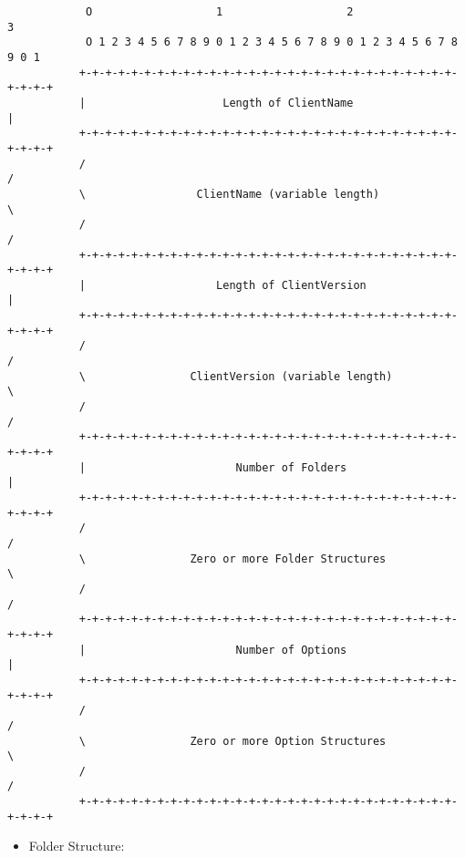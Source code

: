 \begin{verbatim}
            O                   1                   2                   3
            O 1 2 3 4 5 6 7 8 9 0 1 2 3 4 5 6 7 8 9 0 1 2 3 4 5 6 7 8 9 0 1
           +-+-+-+-+-+-+-+-+-+-+-+-+-+-+-+-+-+-+-+-+-+-+-+-+-+-+-+-+-+-+-+-+
           |                     Length of ClientName                      |
           +-+-+-+-+-+-+-+-+-+-+-+-+-+-+-+-+-+-+-+-+-+-+-+-+-+-+-+-+-+-+-+-+
           /                                                               /
           \                 ClientName (variable length)                  \
           /                                                               /
           +-+-+-+-+-+-+-+-+-+-+-+-+-+-+-+-+-+-+-+-+-+-+-+-+-+-+-+-+-+-+-+-+
           |                    Length of ClientVersion                    |
           +-+-+-+-+-+-+-+-+-+-+-+-+-+-+-+-+-+-+-+-+-+-+-+-+-+-+-+-+-+-+-+-+
           /                                                               /
           \                ClientVersion (variable length)                \
           /                                                               /
           +-+-+-+-+-+-+-+-+-+-+-+-+-+-+-+-+-+-+-+-+-+-+-+-+-+-+-+-+-+-+-+-+
           |                       Number of Folders                       |
           +-+-+-+-+-+-+-+-+-+-+-+-+-+-+-+-+-+-+-+-+-+-+-+-+-+-+-+-+-+-+-+-+
           /                                                               /
           \                Zero or more Folder Structures                 \
           /                                                               /
           +-+-+-+-+-+-+-+-+-+-+-+-+-+-+-+-+-+-+-+-+-+-+-+-+-+-+-+-+-+-+-+-+
           |                       Number of Options                       |
           +-+-+-+-+-+-+-+-+-+-+-+-+-+-+-+-+-+-+-+-+-+-+-+-+-+-+-+-+-+-+-+-+
           /                                                               /
           \                Zero or more Option Structures                 \
           /                                                               /
           +-+-+-+-+-+-+-+-+-+-+-+-+-+-+-+-+-+-+-+-+-+-+-+-+-+-+-+-+-+-+-+-+
\end{verbatim}

\begin{itemize}
 \item Folder Structure:
\end{itemize}

